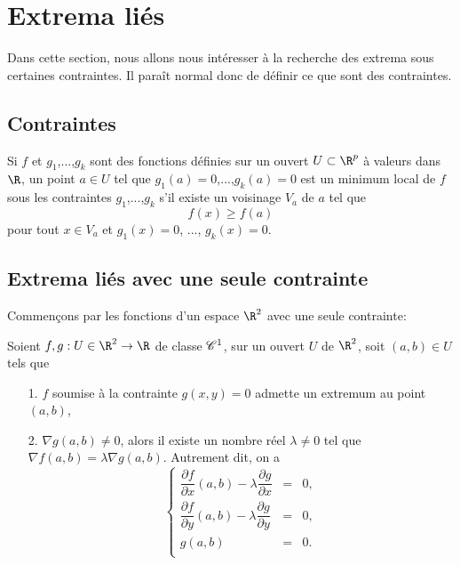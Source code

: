 \documentclass[class=report,crop=false]{standalone}
\begin{document}
\section{Extrema li\'es}


\noindent Dans cette section, nous allons nous intéresser à la recherche des extrema sous certaines contraintes. Il paraît normal donc de
définir ce que sont des contraintes. 

\subsection{Contraintes}
\begin{definition}[CONTRAINTES]
\textcolor[rgb]{0.98,0.00,0.00}{
  Si $f$ et $g_1$,...,$g_k$ sont des fonctions d\'efinies sur un ouvert $U \subset \R^p$ \`a valeurs dans $\R$, un point $a \in U$ tel que $g_1(a)=0$,...,$g_k(a)=0$
est un minimum local de $f$ sous les contraintes $g_1$,...,$g_k$ s'il existe un voisinage $V_a$ de $a$
tel que
\begin{equation*}
  f(x) \geq f(a)
\end{equation*}
pour tout $x \in V_a$ et $g_1(x)=0$, ..., $g_k(x)=0$.}
\end{definition}


\subsection{Extrema liés avec une seule contrainte}

\noindent Commençons par les fonctions d'un espace $\R^2$ avec une seule contrainte:

\begin{theoreme}
\textcolor[rgb]{0.44,0.00,0.87}{
  Soient $f,g: U \in \R^2 \rightarrow \R$ de classe $\mathscr{C}^1$,
sur un ouvert $U$ de $\R^2$, soit $(a,b) \in U$ tels que
\begin{itemize}
\item[1.] $f$ soumise à la contrainte $g(x,y)=0$ admette un 
extremum au point $(a,b)$,
\item[2.] $\nabla g(a,b) \neq 0$,
alors il existe un nombre réel $\lambda \neq 0$ tel que 
$\nabla f(a,b) = \lambda \nabla g(a,b).$
Autrement dit, on a
\begin{equation*}
\left\{
\begin{array}{ccc}
\dfrac{\partial f}{\partial x}(a,b)-\lambda \dfrac{\partial g}{\partial x} & = & 0, \\ 
\dfrac{\partial f}{\partial y}(a,b)-\lambda \dfrac{\partial g}{\partial y}& = & 0, \\ 
g(a,b) & = & 0. \\ 
\end{array}\right.
\end{equation*}
\end{itemize} }
\end{theoreme}
\end{document}
